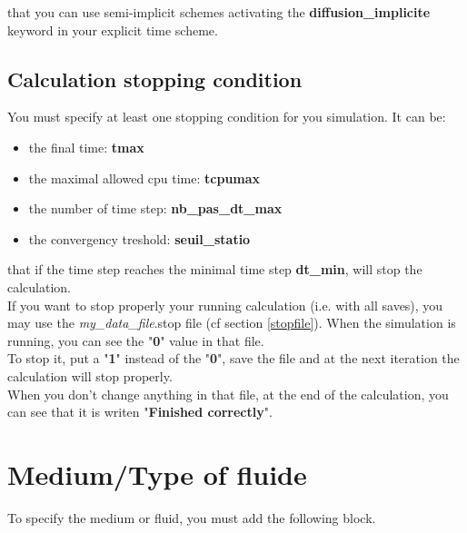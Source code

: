 \Note that you can use semi-implicit schemes activating the \textbf{diffusion\_implicite} keyword in your explicit time scheme.



\subsection{Calculation stopping condition}
You must specify at least one stopping condition for you simulation.
It can be:
\begin{itemize}
\item the final time: \textbf{tmax}
\item the maximal allowed cpu time: \textbf{tcpumax}
\item the number of time step: \textbf{nb\_pas\_dt\_max}
\item the convergency treshold: \textbf{seuil\_statio}
\end{itemize}

\Note that if the time step reaches the minimal time step \textbf{dt\_min}, \trust will stop the calculation.\\

If you want to stop properly your running calculation (i.e. with all saves), you may use the \textit{my\_data\_file}.stop file (cf section \ref{stopfile}).
When the simulation is running, you can see the "\textbf{0}" value in that file.\\

To stop it, put a "\textbf{1}" instead of the "\textbf{0}", save the file and at the next iteration the calculation will stop properly.\\

When you don't change anything in that file, at the end of the calculation, you can see that it is writen "\textbf{Finished correctly}".


\section{Medium/Type of fluide}
To specify the medium or fluid, you must add the following block.

    \begin{center}
    \end{center}

